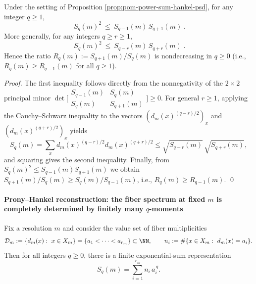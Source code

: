 \begin{corollary}\label{cor:pom-crossq-logconvex-chain}
Under the setting of Proposition \ref{prop:pom-power-sum-hankel-psd}, for any integer \(q\ge 1\),
\[
\boxed{\;
S_q(m)^2\ \le\ S_{q-1}(m)\,S_{q+1}(m)\; }.
\]
More generally, for any integers \(q\ge r\ge 1\),
\[
\boxed{\;
S_q(m)^2\ \le\ S_{q-r}(m)\,S_{q+r}(m)\; }.
\]
Hence the ratio
\(
R_q(m):=S_{q+1}(m)/S_q(m)
\)
is nondecreasing in \(q\ge 0\) (i.e., \(R_{q}(m)\ge R_{q-1}(m)\) for all \(q\ge 1\)).
\end{corollary}
\begin{proof}
The first inequality follows directly from the nonnegativity of the \(2\times 2\) principal minor \(\det\bigl[\begin{smallmatrix}S_{q-1}(m)&S_q(m)\\ S_q(m)&S_{q+1}(m)\end{smallmatrix}\bigr]\ge 0\).
For general \(r\ge 1\), applying the Cauchy--Schwarz inequality to the vectors \((d_m(x)^{(q-r)/2})_x\) and \((d_m(x)^{(q+r)/2})_x\) yields
\[
S_q(m)=\sum_x d_m(x)^{(q-r)/2}d_m(x)^{(q+r)/2}
\le \sqrt{S_{q-r}(m)}\,\sqrt{S_{q+r}(m)},
\]
and squaring gives the second inequality.
Finally, from \(S_q(m)^2\le S_{q-1}(m)S_{q+1}(m)\) we obtain
\(
S_{q+1}(m)/S_q(m)\ge S_q(m)/S_{q-1}(m)
\),
i.e., \(R_q(m)\ge R_{q-1}(m)\). \qed
\end{proof}

\paragraph{Prony--Hankel reconstruction: the fiber spectrum at fixed \(m\) is completely determined by finitely many \(q\)-moments}
Fix a resolution \(m\) and consider the value set of fiber multiplicities
\[
\mathcal{D}_m:=\{d_m(x):\ x\in X_m\}=\{a_1<\cdots<a_{r_m}\}\subset\NN,
\qquad
n_i:=\#\{x\in X_m:\ d_m(x)=a_i\}.
\]
Then for all integers \(q\ge 0\), there is a finite exponential-sum representation
\[
S_q(m)=\sum_{i=1}^{r_m} n_i\,a_i^{\,q}.
\]

